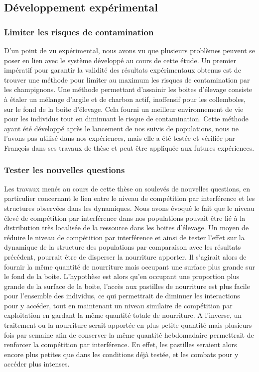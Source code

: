 \subsection{Développement expérimental}

\subsubsection{Limiter les risques de contamination}

D'un point de vu expérimental, nous avons vu que plusieurs problèmes peuvent se
poser en lien avec le système développé au cours de cette étude. Un premier
impératif pour garantir la validité des résultats expérimentaux obtenus est de
trouver une méthode pour limiter au maximum les risques de contamination par les
champignons. Une méthode permettant d'assainir les boites d'élevage consiste à
étaler un mélange d'argile et de charbon actif, inoffensif pour les collemboles,
sur le fond de la boite d'élevage. Cela fourni un meilleur environnement de vie
pour les individus tout en diminuant le risque de contamination. Cette méthode
ayant été développé après le lancement de nos suivis de populations, nous ne
l'avons pas utilisé dans nos expériences, mais elle a été testée et vérifiée par
François \textcites{mallard2013b} dans ses travaux de thèse et peut être
appliquée aux futures expériences. 

\subsubsection{Tester les nouvelles questions}

Les travaux menés au cours de cette thèse on soulevés de nouvelles questions, en
particulier concernant le lien entre le niveau de compétition par interférence
et les structures observées dans les dynamiques. Nous avons évoqué le fait que
le niveau élevé de compétition par interférence dans nos populations pouvait
être lié à la distribution très localisée de la ressource dans les boites
d'élevage. Un moyen de réduire le niveau de compétition par interférence et
ainsi de tester l'effet sur la dynamique de la structure des populations par
comparaison avec les résultats précédent, pourrait être de disperser la
nourriture apporter. Il s'agirait alors de fournir la même quantité de
nourriture mais occupant une surface plus grande sur le fond de la boite.
L'hypothèse est alors qu'en occupant une proportion plus grande de la surface de
la boite, l'accès aux pastilles de nourriture est plus facile pour l'ensemble
des individus, ce qui permettrait de diminuer les interactions pour y accéder,
tout en maintenant un niveau similaire de compétition par exploitation en
gardant la même quantité totale de nourriture. A l'inverse, un traitement ou la
nourriture serait apportée en plus petite quantité mais plusieurs fois par
semaine afin de conserver la même quantité hebdomadaire permettrait de renforcer
la compétition par interférence. En effet, les pastilles seraient alors encore
plus petites que dans les conditions déjà testée, et les combats pour y accéder
plus intenses. 

